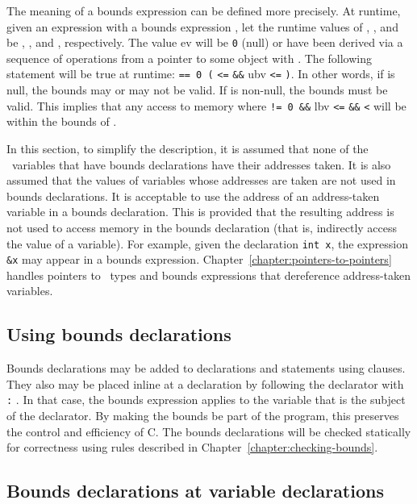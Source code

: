 The meaning of a bounds expression can be defined more precisely. At
runtime, given an expression  with a bounds expression
, let the runtime
values of , , and  be , ,
and , respectively. The value ev will be \texttt{0} (null) or
have been derived via a sequence of operations from a pointer to some
object  with .
The following statement will be true at runtime:
 \texttt{== 0 \textbar{}\textbar{} (}
\texttt{<=}  \texttt{\&\&} ubv \texttt{<=}
\texttt{)}. In other words, if  is null, the bounds
may or may not be valid. If  is non-null, the bounds must be
valid. This implies that any access to memory where  \texttt{!=
0 \&\&} lbv \texttt{<=}  \texttt{\&\&} 
\texttt{<}  will be within the bounds of .

In this section, to simplify the description, it is assumed that none of
the \arrayptr\ variables that have bounds declarations have
their addresses taken. It is also assumed that the values of variables
whose addresses are taken are not used in bounds declarations. It is
acceptable to use the address of an address-taken variable in a bounds
declaration. This is provided that the resulting address is not used to
access memory in the bounds declaration (that is, indirectly access the
value of a variable). For example, given the declaration \texttt{int x},
the expression \texttt{\&x} may appear in a bounds expression.  
Chapter~\ref{chapter:pointers-to-pointers}
handles pointers to \arrayptr\ types and bounds expressions
that dereference address-taken variables.

\subsection{Using bounds declarations}

Bounds declarations may be added to declarations and statements using
 clauses. They also may be placed inline at a declaration
by following the declarator with \texttt{:} . In that
case, the bounds expression applies to the variable that is the subject
of the declarator. By making the bounds be part of the program, this
preserves the control and efficiency of C. The bounds declarations will
be checked statically for correctness using rules described in 
Chapter~\ref{chapter:checking-bounds}.

\subsection{Bounds declarations at variable declarations}
\label{section:variable-declarations}

